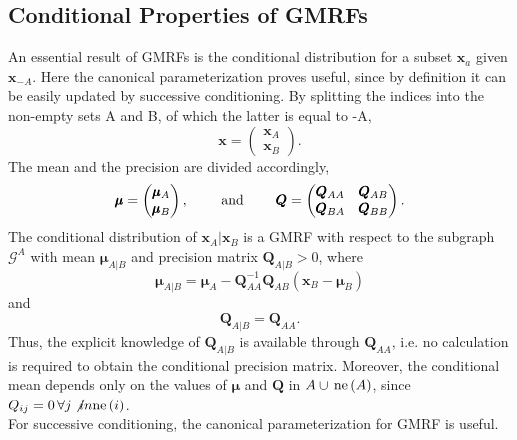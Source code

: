 \subsection{Conditional Properties of GMRFs}
An essential result of GMRFs is the conditional distribution for a subset $\pmb{x}_a$ given $\pmb{x}_{-A}$. Here the canonical parameterization proves useful, since by definition it can be easily updated by successive conditioning. \clearpage
By splitting the indices into the non-empty sets A and B, of which the latter is equal to -A,
\begin{equation}\label{eq:partition_1}
    \pmb{x}=\begin{pmatrix}\pmb{x}_A\\\pmb{x}_B\end{pmatrix}.
\end{equation}
The mean and the precision are divided accordingly,
\begin{equation}\label{eq:partition_2}
    \pmb{\mu}=\begin{pmatrix}\pmb{\mu}_A\\\pmb{\mu}_B\end{pmatrix},\hspace{20pt}\hbox{ and }\hspace{20pt}\pmb{Q}=\begin{pmatrix}\pmb{Q}_{AA} & \pmb{Q}_{AB} \\ \pmb{Q}_{BA} & \pmb{Q}_{BB}\end{pmatrix}.
\end{equation}
The conditional distribution of $\pmb{x}_A|\pmb{x}_B$ is a GMRF with respect to the subgraph $\mathcal{G}^A$ with mean $\pmb{\mu}_{A|B}$ and precision matrix $\pmb{Q}_{A|B}>0$, where
\begin{equation}
    \pmb{\mu}_{A|B}=\pmb{\mu}_A-\pmb{Q}_{AA}^{-1}\pmb{Q}_{AB}\left(\pmb{x}_B-\pmb{\mu}_B\right)
\end{equation}
and
\begin{equation*}
    \pmb{Q}_{A|B}=\pmb{Q}_{AA}.
\end{equation*}
Thus, the explicit knowledge of $\pmb{Q}_{A|B}$ is available through $\pmb{Q}_{AA}$, i.e. no calculation is required to obtain the conditional precision matrix. Moreover, the conditional mean depends only on the values of $\pmb{\mu}$ and $\pmb{Q}$ in $A\cup\,\hbox{ne}\left(A\right)$, since $Q_{ij} = 0\,\forall j\not in\hbox{ne}\left(i\right)$. \\
For successive conditioning, the canonical parameterization for GMRF is useful. \\
